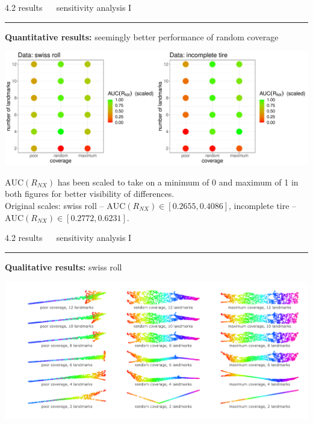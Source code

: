 \documentclass[11pt, compress, t, notes = noshow, xcolor = table, 
aspectratio = 1610]{beamer}
\begin{document}
\LARGE
\begin{frame}{\textcolor{gray!90}{4.2 results} ~~ sensitivity analysis I}
\normalsize
\vspace{-0.5cm}
\noindent \textcolor{gray!90}{\rule{\textwidth}{1pt}}
\smallskip

\textbf{Quantitative results:} seemingly better performance of random coverage

\vspace{0.3cm}

\includegraphics[trim = 0 0 0 0, clip, %
    width = \textwidth]{figures/sensitivity_landmarks_auc}
    
\vfill

\scriptsize
$\text{AUC}(R_{NX})$ has been scaled to take on a minimum of 0 and maximum of 1 
in both figures for better visibility of differences. \\
Original scales: swiss roll -- $\text{AUC}(R_{NX}) \in [0.2655, 0.4086]$, 
incomplete tire -- $\text{AUC}(R_{NX}) \in [0.2772, 0.6231]$.

\end{frame}


\LARGE
\begin{frame}{\textcolor{gray!90}{4.2 results} ~~ sensitivity analysis I}
\normalsize
\vspace{-0.5cm}
\noindent \textcolor{gray!90}{\rule{\textwidth}{1pt}}
\smallskip

\textbf{Qualitative results:} swiss roll

\vspace{0.3cm}

\includegraphics[trim = 40 10 0 0, clip, %
    width = \textwidth]{figures/sensitivity_landmarks_qual_swiss_roll}

\end{frame}
\end{document}
